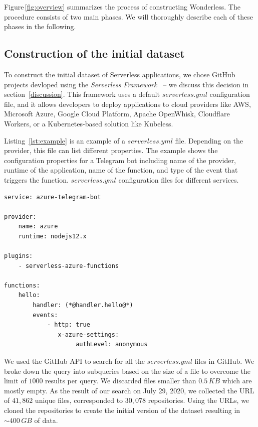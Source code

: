 Figure\,\ref{fig:overview} summarizes the  process of constructing Wonderless. 
The procedure consists of two main phases. 
We will thoroughly describe each of these phases in the following.

\subsection{Construction of the initial dataset} \label{phaseA}

To construct the initial dataset of Serverless applications, we chose GitHub projects 
devloped using the {\it Serverless Framework}~\cite{TODO} 
-- we discuss this decision in section~\ref{discussion}.
This framework uses a default $serverless.yml$ configuration file, 
and it allows developers to deploy 
applications to cloud providers like AWS, Microsoft Azure, Google Cloud 
Platform, Apache OpenWhisk, Cloudflare Workers, or a Kubernetes-based 
solution like Kubeless.

Listing~\ref{lst:example} is an example of a $serverless.yml$ file. 
Depending on the provider, this file can list different properties.
The example shows the configuration properties for a Telegram bot including 
name of the provider, runtime of the application, name of the function, 
and type of the event that triggers the function. 
$serverless.yml$ configuration files for different services.

\vspace{1mm}

\begin{lstlisting}[frame=single, caption=An example of a serverless.yml file., label={lst:example}, captionpos=b]
service: azure-telegram-bot 

provider:  
	name: azure
	runtime: nodejs12.x  
	
plugins:  
	- serverless-azure-functions 

functions:
	hello:    
		handler: (*@handler.hello@*)
		events:   
			- http: true        
			   x-azure-settings:          
			   		authLevel: anonymous
\end{lstlisting}


We used the GitHub API to search for all the $serverless.yml$ files in GitHub. 
We broke down the query into subqueries based on the size of a file to 
overcome the limit of $1000$ results per query.
We discarded files smaller than $0.5\,KB$ which are mostly empty.
As the result of our search on July 29, 2020, 
we collected the URL of $41,862$ unique files, corresponded to 
$30,078$ repositories. Using the URLs, we cloned 
the repositories to create the initial version of the dataset 
resulting in $\sim400 \, GB$ of data.



